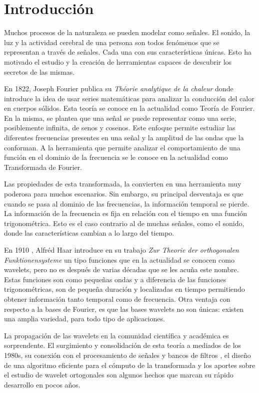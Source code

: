 \chapter*{Introducción}\label{chapter:introduction}

Muchos procesos de la naturaleza se pueden modelar como señales. El sonido, la luz y la actividad
cerebral de una persona son todos fenómenos que se representan a través de señales. Cada una con
sus características únicas. Esto ha motivado el estudio y la creación de herramientas capaces
de descubrir los secretos de las mismas. 

En 1822, Joseph Fourier publica su \textit{ Théorie analytique de la chaleur } \cite{Fourier2009} donde introduce la idea de usar
series matemáticas para analizar la conducción del calor en cuerpos sólidos. Esta teoría se conoce en
la actualidad como Teoría de Fourier. En la misma, se plantea que una señal se puede representar como
una serie, posiblemente infinita, de senos y cosenos. Este enfoque permite estudiar las diferentes 
frecuencias presentes en una señal y la amplitud de las ondas que la conforman. A la herramienta que permite
analizar el comportamiento de una función en el dominio de la frecuencia se le conoce en la actualidad como
Transformada de Fourier.

Las propiedades de esta transformada, la convierten en una herramienta muy poderosa para muchos escenarios. 
Sin embargo, su principal desventaja es que cuando se pasa al dominio de las frecuencias, la información 
temporal se pierde. La información de la frecuencia es fija en relación con el tiempo en una función 
trigonométrica. Esto es el caso contrario al de muchas señales, como el sonido, donde las características
cambian a lo largo del tiempo. 

En 1910 , Alfréd Haar introduce en su trabajo \textit{Zur Theorie der orthogonalen Funktionensysteme} \cite{Haar1910} un tipo 
funciones que en la actualidad se conocen como wavelets, pero no es
después de varias décadas que se les acuña este nombre. Estas funciones son como pequeñas ondas y a diferencia
de las funciones trigonométricas, son de pequeña duración y localizadas en tiempo permitiendo obtener información tanto temporal como
de frecuencia. Otra ventaja con respecto a la bases de Fourier, es que las bases wavelets no son únicas: 
existen una amplia variedad, para todo tipo de aplicaciones. 

La propagación de las wavelets en la comunidad científica y académica es sorprendente.
El surgimiento y consolidación de esta teoría a mediados de los 1980s, su conexión con el procesamiento
de señales y bancos de filtros \cite{Mallat2008}, el diseño de una algoritmo eficiente para el cómputo de la transformada \cite{Mallat2008}
y los aportes sobre el estudio de wavelet ortogonales \cite{daubechies1992} son algunos hechos que marcan su rápido desarrollo en
pocos años.   

